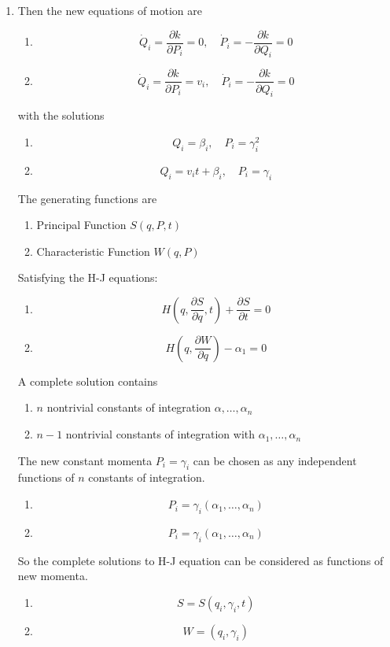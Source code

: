 \documentclass{article}
\begin{document}
\begin{enumerate}
		\item Then the new equations of motion are
		\begin{enumerate}
			\item 
			\[
			\dot{Q}_i = \frac{\partial k}{\partial P_i} = 0, \quad \dot{P}_i = -\frac{\partial k}{\partial Q_i} = 0
			\]
			\item
			\[
			\dot{Q}_i = \frac{\partial k}{\partial P_i} = v_i, \quad \dot{P}_i = -\frac{\partial k}{\partial Q_i} = 0
			\]
		\end{enumerate}
		with the solutions
		\begin{enumerate}
			\item 
			\[
			Q_i = \beta_i, \quad P_i = \gamma_i^2
			\]
			\item
			\[
			Q_i = v_i t + \beta_i, \quad P_i = \gamma_i
			\]
		\end{enumerate}
		The generating functions are
		\begin{enumerate}
			\item Principal Function $S(q, P, t)$
			\item Characteristic Function $W(q, P)$
		\end{enumerate}
		Satisfying the H-J equations:
		\begin{enumerate}
			\item 
			\[
			H(q, \frac{\partial S}{\partial q}, t) + \frac{\partial S}{\partial t} = 0
			\]
			\item
			\[
			H(q, \frac{\partial W}{\partial q}) - \alpha_1 = 0
			\]
		\end{enumerate}
		A complete solution contains
		\begin{enumerate}
			\item $n$ nontrivial constants of integration $\alpha, \dots, \alpha_n$
			\item $n-1$ nontrivial constants of integration with $\alpha_1, \dots, \alpha_n$
		\end{enumerate}
		The new constant momenta $P_i = \gamma_i$ can be chosen as any independent functions of $n$ constants of integration.
		\begin{enumerate}
			\item 
			\[
			P_i = \gamma_i(\alpha_1, \dots, \alpha_n)
			\]
			\item
			\[
			P_i = \gamma_i(\alpha_1, \dots, \alpha_n)
			\]
		\end{enumerate}
		So the complete solutions to H-J equation can be considered as functions of new momenta.
		\begin{enumerate}
			\item 
			\[
			S = S(q_i, \gamma_i, t)
			\]
			\item
			\[
			W = (q_i, \gamma_i)
			\]
		\end{enumerate}
		

\end{enumerate}
\end{document}
